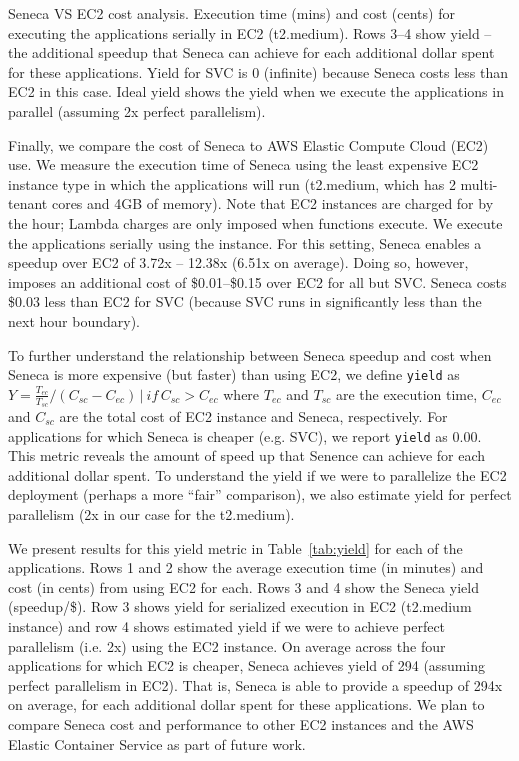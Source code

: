 \begin{table}
\centering

\caption{Seneca VS EC2 cost analysis. Execution time (mins) and cost (cents) for
executing the applications serially in EC2 (t2.medium).  
Rows 3--4 show yield -- the additional speedup that
Seneca can achieve for each additional dollar spent for these applications.
Yield for SVC is 0 (infinite) because Seneca costs less than EC2 in this case.
Ideal yield shows the yield when we execute the applications in parallel (assuming
2x perfect parallelism).
\label{tab:yield}}
\vspace{-0.1in}
\end{table}

Finally, we compare the cost of Seneca to AWS Elastic Compute Cloud (EC2) use. 
We measure the execution time of Seneca using the
least expensive EC2 instance type in which the applications will run
(t2.medium, which has 2 multi-tenant cores and 4GB of memory). 
Note that EC2 instances are charged for by the hour; Lambda charges 
are only imposed when functions execute. We execute the applications serially
using the instance.  For this setting, Seneca enables a speedup over EC2 
of 3.72x -- 12.38x (6.51x on average). Doing so, however, imposes an additional 
cost of \$0.01--\$0.15 over EC2 for all but SVC. 
Seneca costs \$0.03 less than EC2 for SVC (because SVC runs in significantly less than
the next hour boundary).

To further understand the relationship between Seneca speedup and cost when Seneca
is more expensive (but faster) than using EC2, we define \texttt{yield} as 
$Y=\frac{T_{ec}}{T_{sc}}/({C_{sc} - C_{ec}}) \,|\ if \,C_{sc} > C_{ec}$ where $T_{ec}$ and $T_{sc}$ are the execution time, $C_{ec}$ and $C_{sc}$ are the total cost of EC2 instance 
and Seneca, respectively.
For applications for which Seneca is cheaper (e.g. SVC), we report \texttt{yield} 
as $0.00$.  This metric reveals the amount of speed up that Senence can achieve 
for each additional dollar spent.  To understand the yield if we were to 
parallelize the EC2 deployment (perhaps a more ``fair'' comparison), 
we also estimate yield for perfect parallelism (2x in our case for 
the t2.medium).  

We present results for this yield metric in Table~\ref{tab:yield} for each of the applications.
Rows 1 and 2 show the average execution time (in minutes) and cost (in cents) 
from using EC2 for each.
Rows 3 and 4 show the Seneca yield (speedup/\$).
Row 3 shows yield for serialized execution in EC2 (t2.medium
instance) and row 4 shows estimated yield if we were to achieve perfect parallelism
(i.e. 2x) using the EC2 instance. On average across the four applications for which
EC2 is cheaper, Seneca achieves yield of 294 (assuming perfect parallelism in EC2). 
That is, Seneca is able to provide a speedup
of 294x on average, for each additional dollar spent for these applications.
We plan to compare Seneca cost and performance 
to other EC2 instances and the AWS Elastic Container Service
as part of future work.

